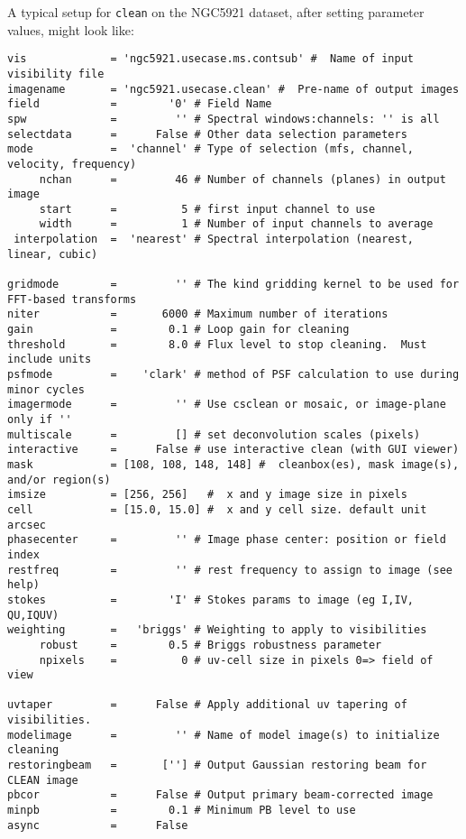 A typical setup for {\tt clean} on the NGC5921 dataset, 
after setting parameter values, might look like:
\small
\begin{verbatim}
vis             = 'ngc5921.usecase.ms.contsub' #  Name of input visibility file
imagename       = 'ngc5921.usecase.clean' #  Pre-name of output images
field           =        '0' # Field Name
spw             =         '' # Spectral windows:channels: '' is all
selectdata      =      False # Other data selection parameters
mode            =  'channel' # Type of selection (mfs, channel, velocity, frequency)
     nchan      =         46 # Number of channels (planes) in output image
     start      =          5 # first input channel to use
     width      =          1 # Number of input channels to average
 interpolation  =  'nearest' # Spectral interpolation (nearest, linear, cubic)

gridmode        =         '' # The kind gridding kernel to be used for FFT-based transforms
niter           =       6000 # Maximum number of iterations
gain            =        0.1 # Loop gain for cleaning
threshold       =        8.0 # Flux level to stop cleaning.  Must include units
psfmode         =    'clark' # method of PSF calculation to use during minor cycles
imagermode      =         '' # Use csclean or mosaic, or image-plane only if ''
multiscale      =         [] # set deconvolution scales (pixels)
interactive     =      False # use interactive clean (with GUI viewer)
mask            = [108, 108, 148, 148] #  cleanbox(es), mask image(s), and/or region(s)
imsize          = [256, 256]   #  x and y image size in pixels
cell            = [15.0, 15.0] #  x and y cell size. default unit arcsec
phasecenter     =         '' # Image phase center: position or field index
restfreq        =         '' # rest frequency to assign to image (see help)
stokes          =        'I' # Stokes params to image (eg I,IV, QU,IQUV)
weighting       =   'briggs' # Weighting to apply to visibilities
     robust     =        0.5 # Briggs robustness parameter
     npixels    =          0 # uv-cell size in pixels 0=> field of view

uvtaper         =      False # Apply additional uv tapering of  visibilities.
modelimage      =         '' # Name of model image(s) to initialize cleaning
restoringbeam   =       [''] # Output Gaussian restoring beam for CLEAN image
pbcor           =      False # Output primary beam-corrected image
minpb           =        0.1 # Minimum PB level to use
async           =      False        
\end{verbatim}
\normalsize

